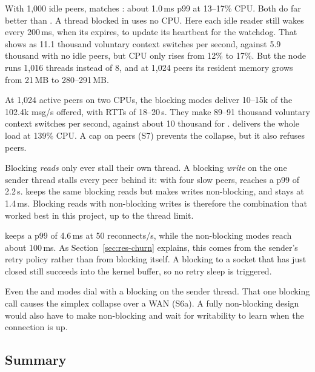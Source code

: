  With
1,000 idle peers,  matches : about 1.0\,ms p99 at
13--17\% CPU. Both do far better than . A thread blocked in 
uses no CPU. Here each idle reader still wakes every 200\,ms, when its
 expires, to update its heartbeat for the watchdog. That shows as
11.1 thousand voluntary context switches per second, against 5.9 thousand with no
idle peers, but CPU only rises from 12\% to 17\%. But the node runs 1,016 threads instead of 8, and at 1,024 peers its
resident memory grows from 21\,MB to 280--291\,MB.

 At 1,024 active peers on two CPUs, the
blocking modes deliver 10--15k of the 102.4k msg/s offered, with RTTs of 18--20\,s.
They make 89--91 thousand voluntary context switches per second, against about 10
thousand for .  delivers the whole load at
139\% CPU. A cap on peers (S7) prevents the collapse, but it also refuses peers.

 Blocking
\emph{reads} only ever stall their own thread. A blocking \emph{write} on the one
sender thread stalls every peer behind it: with four slow peers, 
reaches a p99 of 2.2\,s.  keeps the same blocking reads but makes
writes non-blocking, and stays at 1.4\,ms. Blocking reads with non-blocking writes is
therefore the combination that worked best in this project, up to the thread limit.

  keeps a p99 of
4.6\,ms at 50 reconnects/s, while the non-blocking modes reach about 100\,ms. As
Section~\ref{sec:res-churn} explains, this comes from the sender's retry policy rather
than from blocking itself. A blocking  to a socket that has just closed
still succeeds into the kernel buffer, so no retry sleep is triggered.

 Even the 
and  modes dial with a blocking  on the sender thread.
That one blocking call causes the simplex collapse over a WAN (S6a). A fully
non-blocking design would also have to make  non-blocking and wait
for writability to learn when the connection is up.

\subsection{Summary}

